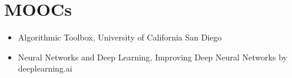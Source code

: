 \documentclass[letterpaper,11pt]{article}
\newcommand{\resumeSimpleItem}[1]{
    \item\small{
        {#1}
    }
}
\newcommand{\resumeItemListStart}{\begin{itemize}}
\newcommand{\resumeItemListEnd}{\end{itemize}\vspace{-5pt}}
\begin{document}
\section{MOOCs}
    \resumeItemListStart
        \resumeSimpleItem {Algorithmic Toolbox, University of California San Diego}
        \resumeSimpleItem {Neural Networks and Deep Learning, Improving Deep Neural Networks by deeplearning.ai}
    \resumeItemListEnd



\end{document}
